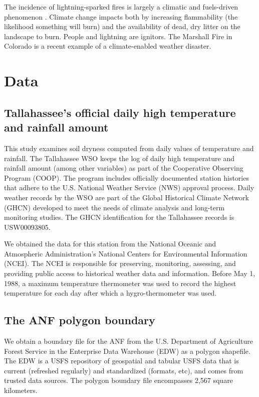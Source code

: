 \documentclass[12pt]{iopart}
\begin{document}
The incidence of lightning-sparked fires is largely a climatic and fuels-driven phenomenon \citep{Littell2016}. Climate change impacts both by increasing flammability (the likelihood something will burn) and the availability of dead, dry litter on the landscape to burn. People and lightning are ignitors. The Marshall Fire in Colorado is a recent example of a climate-enabled weather disaster. 

\section{Data}

\subsection{Tallahassee’s official daily high temperature and rainfall amount} 

This study examines soil dryness computed from daily values of temperature and rainfall. The Tallahassee WSO keeps the log of daily high temperature and rainfall amount (among other variables) as part of the Cooperative Observing Program (COOP). The program includes officially documented station histories that adhere to the U.S. National Weather Service (NWS) approval process. Daily weather records by the WSO are part of the Global Historical Climate Network (GHCN) developed to meet the needs of climate analysis and long-term monitoring studies. The GHCN identification for the Tallahassee records is USW00093805. 

We obtained the data for this station from the National Oceanic and Atmospheric Administration's National Centers for Environmental Information (NCEI). The NCEI is responsible for preserving, monitoring, assessing, and providing public access to historical weather data and information. Before May 1, 1988, a maximum temperature thermometer was used to record the highest temperature for each day after which a hygro-thermometer was used. 

\subsection{The ANF polygon boundary}

We obtain a boundary file for the ANF from the U.S. Department of Agriculture Forest Service in the Enterprise Data Warehouse (EDW) as a polygon shapefile. The EDW is a USFS repository of geospatial and tabular USFS data that is current (refreshed regularly) and standardized (formats, etc), and comes from trusted data sources. The polygon boundary file encompasses 2,567 square kilometers. 
\end{document}
